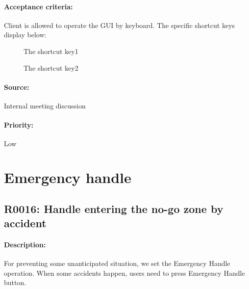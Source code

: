 \documentclass[11pt, a4paper]{report}
\begin{document}
\paragraph{Acceptance criteria:}
Client is allowed to operate the GUI by keyboard. The specific shortcut keys display below:
\begin{figure}[ht]
\centering
\setlength\fboxsep{2pt}
\setlength\fboxrule{0.2pt}
\caption{The shortcut key1}
\label{sec:NXJCC}
\label{fig:NXJCC}
\end{figure}
\begin{figure}[ht]
\centering
\setlength\fboxsep{2pt}
\setlength\fboxrule{0.2pt}
\caption{The shortcut key2}
\label{sec:NXJCC}
\label{fig:NXJCC}
\end{figure}
\pagebreak
\paragraph{Source:}
Internal meeting discussion
\paragraph{Priority:}
Low


\section{Emergency handle}
\subsection{R0016: Handle entering the no-go zone by accident}
\paragraph{Description:}
For preventing some unanticipated situation, we set the Emergency Handle operation. When some accidents happen, users need to press Emergency Handle button.
\end{document}
